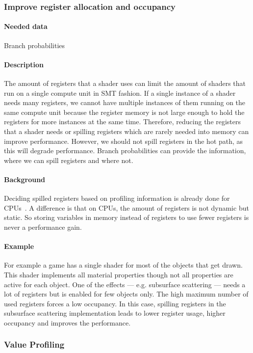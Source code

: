 \subsubsection{Improve register allocation and occupancy}
\paragraph{Needed data} Branch probabilities
\paragraph{Description} The amount of registers that a shader uses can limit the amount of shaders that run on a single compute unit in \gls{SMT} fashion. If a single instance of a shader needs many registers, we cannot have multiple instances of them running on the same compute unit because the register memory is not large enough to hold the registers for more instances at the same time.
Therefore, reducing the registers that a shader needs or spilling registers which are rarely needed into memory can improve performance. However, we should not spill registers in the hot path, as this will degrade performance.
Branch probabilities can provide the information, where we can spill registers and where not.
\paragraph{Background} Deciding spilled registers based on profiling information is already done for CPUs~\cite{Bakhvalov2019}. A difference is that on CPUs, the amount of registers is not dynamic but static. So storing variables in memory instead of registers to use fewer registers is never a performance gain.
\paragraph{Example} For example a game has a single shader for most of the objects that get drawn. This shader implements all material properties though not all properties are active for each object.
One of the effects --- e.g. subsurface scattering --- needs a lot of registers but is enabled for few objects only. The high maximum number of used registers forces a low occupancy.
In this case, spilling registers in the subsurface scattering implementation leads to lower register usage, higher occupancy and improves the performance.

\subsubsection{Value Profiling}
